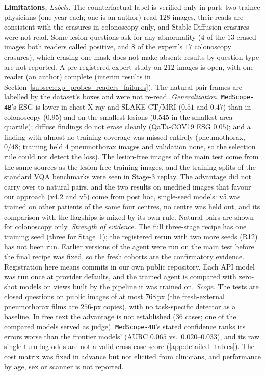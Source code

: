 \documentclass[5p,times,twocolumn,authoryear]{elsarticle}
\begin{document}
\textbf{Limitations.} \emph{Labels.} The counterfactual label is verified only in part: two trainee physicians (one year each; one is an author) read $128$ images, their reads are consistent with the erasures in colonoscopy only, and Stable Diffusion erasures were not read. Some lesion questions ask for any abnormality ($4$ of the $13$ erased images both readers called positive, and $8$ of the expert's $17$ colonoscopy erasures), which erasing one mask does not make absent; results by question type are not reported. A pre-registered expert study on $212$ images is open, with one reader (an author) complete (interim results in Section~\ref{subsec:exp_probes_readers_failures}). The natural-pair frames are labelled by the dataset's boxes and were not re-read. \emph{Generalization.} \texttt{MedScope-4B}'s ESG is lower in chest X-ray and SLAKE CT/MRI ($0.51$ and $0.47$) than in colonoscopy ($0.95$) and on the smallest lesions ($0.545$ in the smallest area quartile); diffuse findings do not erase cleanly (QaTa-COV19 ESG $0.05$); and a finding with almost no training coverage was missed entirely (pneumothorax, $0/48$; training held $4$ pneumothorax images and validation none, so the selection rule could not detect the loss). The lesion-free images of the main test come from the same sources as the lesion-free training images, and the training splits of the standard VQA benchmarks were seen in Stage-3 replay. The advantage did not carry over to natural pairs, and the two results on unedited images that favour our approach (v4.2 and v5) come from post hoc, single-seed models: v5 was trained on other patients of the same four centres, no centre was held out, and its comparison with the flagships is mixed by its own rule. Natural pairs are shown for colonoscopy only. \emph{Strength of evidence.} The full three-stage recipe has one training seed (three for Stage~1); the registered rerun with two more seeds (R12) has not been run. Earlier versions of the agent were run on the main test before the final recipe was fixed, so the fresh cohorts are the confirmatory evidence. Registration here means commits in our own public repository. Each API model was run once at provider defaults, and the trained agent is compared with zero-shot models on views built by the pipeline it was trained on. \emph{Scope.} The tests are closed questions on public images of at most $768$\,px (the fresh-external pneumothorax films are $256$-px copies), with no task-specific detector as a baseline. In free text the advantage is not established ($36$ cases; one of the compared models served as judge). \texttt{MedScope-4B}'s stated confidence ranks its errors worse than the frontier models' (AURC $0.065$ vs.\ $0.020$--$0.033$), and its raw single-turn log-odds are not a valid cross-case score (\ref{app:detailed_tables}). The cost matrix was fixed in advance but not elicited from clinicians, and performance by age, sex or scanner is not reported.
\end{document}
